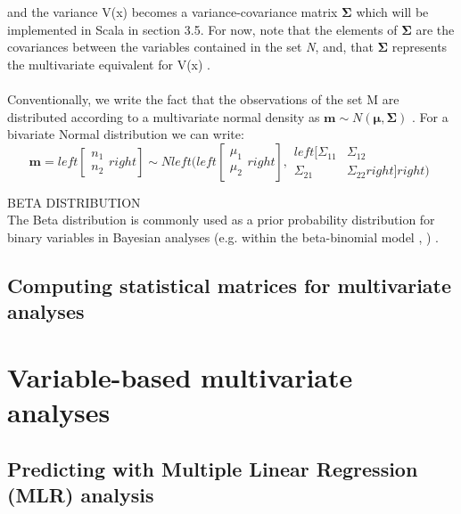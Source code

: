 \documentclass {article}
\begin{document}
and the variance V(x) becomes a variance-covariance matrix $\boldsymbol{\Sigma}$ \cite{jackman_bayesian_2009} \cite{marden_multivariate_2015} which will be implemented in Scala in section 3.5. 
For now, note that the elements of $\boldsymbol{\Sigma}$ are the covariances between the variables contained in the set \textit{N}, and, that $\boldsymbol{\Sigma}$ represents the multivariate equivalent for V(x) \cite{marden_multivariate_2015}.     
\\
\\
Conventionally, we write the fact that the observations of the set M are distributed according to a multivariate normal density as $\mathbf{m} \sim N(\boldsymbol{\mu}, \boldsymbol{\Sigma})$ \cite{jackman_bayesian_2009}.
For a bivariate Normal distribution we can write:
\begin{equation*}
\mathbf{m} = 
left[ \begin{array}{c} 
n_1 \\
n_2
\end{array}
  right]
\sim N left(
left[
\begin{array}{c}
\mu_1 \\
\mu_2
\end{array}
right],
\begin{array}{cc}
left[
\Sigma_11 & \Sigma_12 \\
\Sigma_21 & \Sigma_22
right]
right)
\end{array}
\end{equation*}
  
BETA DISTRIBUTION\\
The Beta distribution is commonly used as a prior probability distribution for binary variables in Bayesian analyses (e.g. within the beta-binomial model \cite{jackman_bayesian_2009}, \cite{pfeffer_practical_2016}) \cite{quinn_experimental_2002}.  

      
\subsection {Computing statistical matrices for multivariate analyses}

 
\section {Variable-based multivariate analyses}

\subsection{Predicting with Multiple Linear Regression (MLR) analysis}
\end{document}
